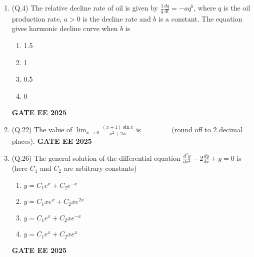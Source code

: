 \documentclass{article}
\begin{document}
\begin{enumerate}[leftmargin=*,label=\textbf{Q.\arabic*},start=1]
    \item (Q.4) The relative decline rate of oil is given by $\frac{1}{q} \frac{dq}{dt} = -aq^b$, where $q$ is the oil production rate, $a > 0$ is the decline rate and $b$ is a constant. The equation gives harmonic decline curve when $b$ is
    \begin{multicols}{4}
    \begin{enumerate}[label=(\Alph*)]
        \item 1.5
        \item 1
        \item 0.5
        \item 0
    \end{enumerate}
    \end{multicols}
    \textbf{GATE EE 2025}

    \item (Q.22) The value of $\lim_{x \to 0} \frac{(x+1)\sin x}{x^2 + 2x}$ is \_\_\_\_\_ (round off to 2 decimal places).
    \textbf{GATE EE 2025}

    \item (Q.26) The general solution of the differential equation $\frac{d^2 y}{dx^2} - 2 \frac{dy}{dx} + y = 0$ is (here $C_1$ and $C_2$ are arbitrary constants)
    \begin{multicols}{2}
    \begin{enumerate}[label=(\Alph*)]
        \item $y = C_1 e^x + C_2 e^{-x}$
        \item $y = C_1 xe^x + C_2 xe^{2x}$
        \item $y = C_1 e^x + C_2 xe^{-x}$
        \item $y = C_1 e^x + C_2 xe^x$
    \end{enumerate}
    \end{multicols}
    \textbf{GATE EE 2025}


\end{enumerate}
\end{document}
